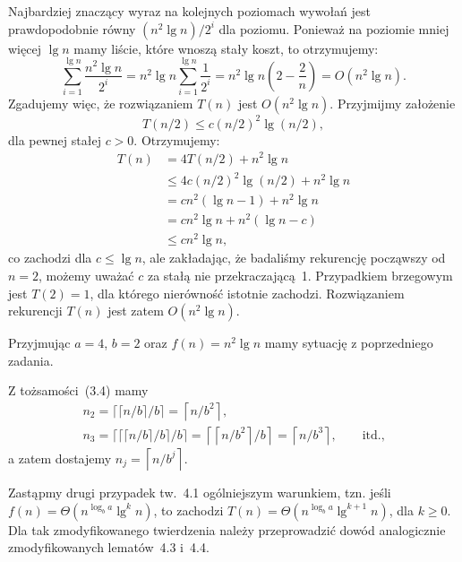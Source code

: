 Najbardziej znaczący wyraz na kolejnych poziomach wywołań jest prawdopodobnie równy $(n^2\lg n)/2^i$ dla  poziomu. Ponieważ na poziomie mniej więcej $\lg n$ mamy liście, które wnoszą stały koszt, to otrzymujemy:
\[
	\sum_{i=1}^{\lg n}\frac{n^2\lg n}{2^i} = n^2\lg n\sum_{i=1}^{\lg n}\frac{1}{2^i} = n^2\lg n\left(2-\frac{2}{n}\right) = O(n^2\lg n).
\]
Zgadujemy więc, że rozwiązaniem $T(n)$ jest $O(n^2\lg n)$. Przyjmijmy założenie
\[
	T(n/2) \le c(n/2)^2\lg(n/2),
\]
dla pewnej stałej $c>0$. Otrzymujemy:
\begin{align*}
	T(n) &= 4T(n/2)+n^2\lg n \\
	&\le 4c(n/2)^2\lg(n/2)+n^2\lg n \\
	&= cn^2(\lg n-1)+n^2\lg n \\
	&= cn^2\lg n+n^2(\lg n-c) \\
	&\le cn^2\lg n,
\end{align*}
co zachodzi dla $c\le\lg n$, ale zakładając, że badaliśmy rekurencję począwszy od $n=2$, możemy uważać $c$ za stałą nie przekraczającą~1. Przypadkiem brzegowym jest $T(2)=1$, dla którego nierówność istotnie zachodzi. Rozwiązaniem rekurencji $T(n)$ jest zatem $O(n^2\lg n)$.

\exercise{} %
\noindent Przyjmując $a=4$, $b=2$ oraz $f(n)=n^2\lg n$ mamy sytuację z poprzedniego zadania.


\exercise{} %
\noindent Z tożsamości~(3.4) mamy
\begin{gather*}
	n_2 = \lceil\lceil n/b\rceil/b\rceil = \left\lceil n/b^2\right\rceil, \\
	n_3 = \lceil\lceil\lceil n/b\rceil/b\rceil/b\rceil = \left\lceil\left\lceil n/b^2\right\rceil\!/b\right\rceil = \left\lceil n/b^3\right\rceil,\qquad\text{itd.,}
\end{gather*}
a zatem dostajemy $n_j=\left\lceil n/b^j\right\rceil$.

\exercise{} %
\noindent Zastąpmy drugi przypadek tw.~4.1 ogólniejszym warunkiem, tzn. jeśli $f(n)=\Theta(n^{\log_ba}\lg^kn)$, to zachodzi $T(n)=\Theta(n^{\log_ba}\lg^{k+1}n)$, dla $k\ge0$. Dla tak zmodyfikowanego twierdzenia należy przeprowadzić dowód analogicznie zmodyfikowanych lematów~4.3 i~4.4.

